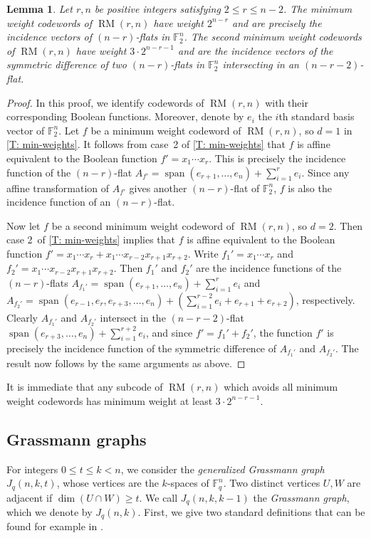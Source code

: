 \documentclass[12pt]{article}
\newtheorem{lem}[thm]{Lemma}
\theoremstyle{definition}
\newcommand{\F}{\mathbb F}
\newcommand{\Fpnv}{\mathbb{F}_2^n}
\DeclareMathOperator{\RM}{RM}
\DeclareMathOperator{\spann}{span}
\begin{document}
\begin{lem}\label{L: min-weights}
    Let $r, n$ be positive integers satisfying $2 \leq r \leq n-2$. The minimum weight codewords of $\RM(r,n)$ have weight $2^{n-r}$ and are precisely the incidence vectors of $(n-r)$-flats in $\F_2^n$. The second minimum weight codewords of $\RM(r,n)$ have weight $3\cdot 2^{n-r-1}$ and are the incidence vectors of the symmetric difference of two $(n-r)$-flats in $\F_2^n$ intersecting in an $(n-r-2)$-flat.
\end{lem}
\begin{proof}
    In this proof, we identify codewords of $\RM(r,n)$ with their corresponding Boolean functions. Moreover, denote by $e_i$ the $i$th standard basis vector of $\Fpnv$. Let $f$ be a minimum weight codeword of $\RM(r,n)$, so $d=1$ in \cref{T: min-weights}. It follows from case~2 of \cref{T: min-weights} that $f$ is affine equivalent to the Boolean function $f' = x_1\cdots x_r$. This is precisely the incidence function of the $(n-r)$-flat $A_{f'} = \spann(e_{r+1},\dots,e_n)+\sum_{i=1}^r e_i$. Since any affine transformation of $A_{f'}$ gives another $(n-r)$-flat of $\Fpnv$, $f$ is also the incidence function of an $(n-r)$-flat.\par

    Now let $f$ be a second minimum weight codeword of $\RM(r,n)$, so $d=2$. Then case 2~of \cref{T: min-weights} implies that $f$ is affine equivalent to the Boolean function $f'=x_1\cdots x_{r} + x_1\cdots x_{r-2}x_{r+1}x_{r+2}$. Write $f_1' = x_1\cdots x_r$ and $f_2' = x_1\cdots x_{r-2}x_{r+1}x_{r+2}$. Then $f_1'$ and $f_2'$ are the incidence functions of the $(n-r)$-flats $A_{f_1'} = \spann(e_{r+1},\dots,e_n) + \sum_{i=1}^r e_i$ and $A_{f_2'} = \spann(e_{r-1},e_{r},e_{r+3},\dots,e_n) + (\sum_{i=1}^{r-2} e_i + e_{r+1} + e_{r+2})$, respectively. Clearly $A_{f_1'}$ and $A_{f_2'}$ intersect in the $(n-r-2)$-flat $\spann(e_{r+3},\dots,e_n) + \sum_{i=1}^{r+2} e_i$, and since $f' = f_1' + f_2'$, the function $f'$ is precisely the incidence function of the symmetric difference of $A_{f_1'}$ and $A_{f_2'}$. The result now follows by the same arguments as above.
\end{proof}
 
It is immediate that any subcode of $\RM(r,n)$ which avoids all minimum weight codewords has minimum weight at least $3\cdot 2^{n-r-1}$.


\subsection{Grassmann graphs}
\label{subsec:graphs}
For integers $0 \le t \leq  k < n$, we consider the \emph{generalized Grassmann graph $J_q(n,k,t)$}, whose vertices are the $k$-spaces of $\F_q^n$. Two distinct vertices $U,W$ are adjacent if $\dim(U \cap W) \ge t$.
We call $J_q(n,k,k-1)$ the \emph{Grassmann graph}, which we denote by $J_q(n,k)$.
First, we give two standard definitions that can be found for example in \cite{algebraic_graph_theory}.
\end{document}
